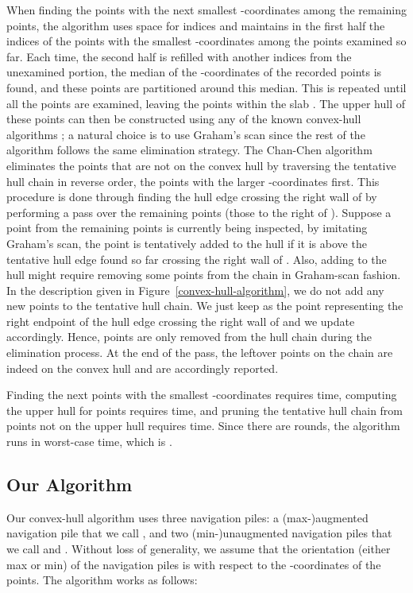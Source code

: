 \documentclass[final,onetabnum,onefignum,onethmnum]{siamltex}
\newcommand{\MinOne}{\mbox{}}
\newcommand{\MinTwo}{\mbox{}}
\newcommand{\MaxPile}{\mbox{}}
\begin{document}
When finding the  points with the next smallest -coordinates
among the remaining points, the algorithm uses space for 
indices and maintains in the first half the  indices of the points with the
smallest -coordinates among the points examined so far. Each time,
the second half is refilled with another  indices from the
unexamined portion, the median of the -coordinates of the 
recorded points is found, and these points are partitioned around this
median. This is repeated until all the points are examined, leaving
the  points within the slab . The upper hull of these
points can then be constructed using any
of the known  convex-hull algorithms \cite[Chapter~3]{PS85}; a natural choice is to use Graham's scan since the rest of
the algorithm follows the same elimination strategy. The Chan-Chen
algorithm eliminates the points that are not on the convex hull by traversing
the tentative hull chain in reverse order, the points with the larger 
-coordinates first. This procedure is done through finding the hull
edge crossing the right wall of  by performing a pass over the
remaining points (those to the right of ). Suppose a point
 from the remaining points is currently being inspected, by
imitating Graham's scan, the point  is tentatively added to the
hull if it is above the tentative hull edge found so far crossing the
right wall of . Also, adding  to the hull might require
removing some points from the chain in Graham-scan fashion. In the description
given in Figure~\ref{convex-hull-algorithm}, we do not add any new points
to the tentative hull chain. We just keep  as the point representing 
the right endpoint of the hull edge crossing the right wall of  and we 
update  accordingly. Hence, points are only removed from the hull chain 
during the elimination process. At the end of the pass, the leftover points on the chain 
are indeed on the convex hull and are accordingly reported.

Finding the next  points with the smallest -coordinates
requires  time, computing the upper hull for  points requires  time, and pruning the tentative hull chain from points not on the
upper hull requires  time. Since there are  rounds, the
algorithm runs in  worst-case time,
which is .

\subsection{Our Algorithm}

Our convex-hull algorithm uses three navigation piles: a
(max-)augmented navigation pile that we call \MaxPile{}, and two
(min-)unaugmented navigation piles that we call \MinOne{} and
\MinTwo{}.  
Without loss of generality, we assume that the orientation (either max or min) 
of the navigation piles is with respect to the -coordinates of the
points. The algorithm works as follows:
\end{document}
